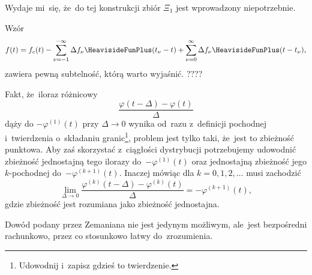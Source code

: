 \documentclass[a4paper,11pt]{article}
\numberwithin{equation}{section}
\begin{document}
Wydaje mi~się, że~do tej konstrukcji zbiór $\Xi_{ 1 }$ jest
wprowadzony niepotrzebnie.

\VerSpaceFour





\noindent
{}

\VerSpaceFour





\noindent
{}

\VerSpaceFour





\noindent
{} Wzór
\begin{equation}
  \label{eq:Zemanian-07}
  f( t ) =
  f_{ c }( t )
  - \sum_{ \nu = -1 }^{ -\infty } \Delta f_{ \nu } \HeavisideFunPlus( t_{ \nu } - t )
  + \sum_{ \nu = 0 }^{ \infty } \Delta f_{ \nu } \HeavisideFunPlus( t - t_{ \nu } ),
\end{equation}
zawiera pewną subtelność, którą warto wyjaśnić. ????

\VerSpaceFour





\noindent
{} Fakt, że~iloraz różnicowy
\begin{equation}
  \label{eq:Zemanian-08}
  \frac{ \varphi( t - \Delta ) - \varphi( t ) }{ \Delta }
\end{equation}
dąży do $-\varphi^{ ( 1 ) }( t )$ przy $\Delta \to 0$ wynika od~razu z~definicji
pochodnej i~twierdzenia o~składaniu granic\footnote{Udowodnij i~zapisz
  gdzieś to twierdzenie.}, problem jest tylko taki, że~jest to
zbieżność punktowa. Aby zaś skorzystać z~ciągłości dystrybucji
potrzebujemy udowodnić zbieżność jednostajną tego ilorazy
do~$-\varphi^{ ( 1 ) }( t )$ oraz jednostajną zbieżność jego $k$-pochodnej
do~$-\varphi^{ ( k + 1 ) }( t )$. Inaczej mówiąc dla $k = 0, 1, 2, \ldots$
musi zachodzić
\begin{equation}
  \label{eq:Zemanian-09}
  \lim_{ \Delta \to 0 }
  \frac{ \varphi^{ ( k ) }( t - \Delta ) - \varphi^{ ( k ) }( t ) }{ \Delta } =
  -\varphi^{ ( k + 1 ) }( t ),
\end{equation}
gdzie zbieżność jest rozumiana jako zbieżność jednostajna.

Dowód podany przez Zemaniana nie jest jedynym możliwym, ale~jest
bezpośredni rachunkowo, przez co stosunkowo łatwy do~zrozumienia.
\end{document}

